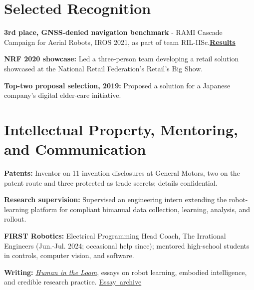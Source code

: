 \documentclass[10pt]{article}
\renewcommand{\evidence}[2]{\nobreak\hspace{0.15em}\mbox{\footnotesize\href{#1}{#2}}}
\begin{document}
\section{Selected Recognition}
\textbf{3rd place, GNSS-denied navigation benchmark} - RAMI Cascade Campaign for Aerial Robots, IROS 2021, as part of team RIL-IISc.\nobreak\hspace{0.3em}\href{https://metricsproject.eu/inspection-maintenance/rami-cascade-campaign1-aerial-robots/}{\textbf{Results}}
\par\vspace{3pt}\textbf{NRF 2020 showcase:} Led a three-person team developing a retail solution showcased at the National Retail Federation's Retail's Big Show.
\par\vspace{3pt}\textbf{Top-two proposal selection, 2019:} Proposed a solution for a Japanese company's digital elder-care initiative.
\section{Intellectual Property, Mentoring, and Communication}
\textbf{Patents:} Inventor on 11 invention disclosures at General Motors, two on the patent route and three protected as trade secrets; details confidential.\par\vspace{3pt}
\textbf{Research supervision:} Supervised an engineering intern extending the robot-learning platform for compliant bimanual data collection, learning, analysis, and rollout.\par\vspace{3pt}
\textbf{FIRST Robotics:} Electrical Programming Head Coach, The Irrational Engineers (Jun.-Jul. 2024; occasional help since); mentored high-school students in controls, computer vision, and software.\par\vspace{3pt}
\textbf{Writing:} \href{https://tvpian.github.io/human-in-the-loom/}{\textit{Human in the Loom}}, essays on robot learning, embodied intelligence, and credible research practice. \evidence{https://tvpian.substack.com/archive}{Essay archive}
\end{document}
